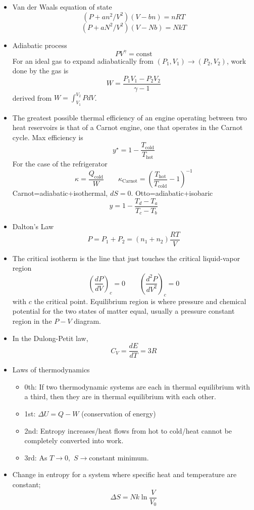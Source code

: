 \documentclass[12pt,a4paper]{book}
\begin{document}
\begin{itemize}
\item Van der Waals equation of state\[
(P+an^{2}/V^{2})(V-bn)=nRT\]
\[
(P+aN^{2}/V^{2})(V-Nb)=NkT\]

\item Adiabatic process\[
PV^{\gamma}=\text{const}\]
For an ideal gas to expand adiabatically from $(P_{1},V_{1})\to(P_{2},V_{2})$,
work done by the gas is\[
W=\frac{P_{1}V_{1}-P_{2}V_{2}}{\gamma-1}\]
derived from $W=\int_{V_{1}}^{V_{2}}PdV$.
\item The greatest possible thermal efficiency of an engine operating between
two heat reservoirs is that of a Carnot engine, one that operates
in the Carnot cycle. Max efficiency is\[
y^{\star}=1-\frac{T_{\text{cold}}}{T_{\text{hot}}}\]
For the case of the refrigerator\[
\kappa=\frac{Q_{\text{cold}}}{W}\qquad\kappa_{\text{Carnot}}=\left(\frac{T_{\text{hot}}}{T_{\text{cold}}}-1\right)^{-1}\]
Carnot=adiabatic+isothermal, $dS=0$. Otto=adiabatic+isobaric\[
y=1-\frac{T_{d}-T_{a}}{T_{c}-T_{b}}\]

\item Dalton's Law\[
P=P_{1}+P_{2}=(n_{1}+n_{2})\frac{RT}{V}\]

\item The critical isotherm is the line that just touches the critical liquid-vapor
region\[
\left(\frac{dP}{dV}\right)_{c}=0\qquad\left(\frac{d^{2}P}{dV^{2}}\right)_{c}=0\]
with $c$ the critical point. Equilibrium region is where pressure
and chemical potential for the two states of matter equal, usually
a pressure constant region in the $P-V$ diagram.
\item In the Dulong-Petit law,\[
C_{V}=\frac{dE}{dT}=3R\]

\item Laws of thermodynamics

\begin{itemize}
\item 0th: If two thermodynamic systems are each in thermal equilibrium
with a third, then they are in thermal equilibrium with each other.
\item 1st: $\Delta U=Q-W$ (conservation of energy)
\item 2nd: Entropy increases/heat flows from hot to cold/heat cannot be
completely converted into work.
\item 3rd: As $T\to0,$ $S\to$constant minimum.
\end{itemize}
\item Change in entropy for a system where specific heat and temperature
are constant;\[
\Delta S=Nk\ln\frac{V}{V_{0}}\]


\end{itemize}
\end{document}
